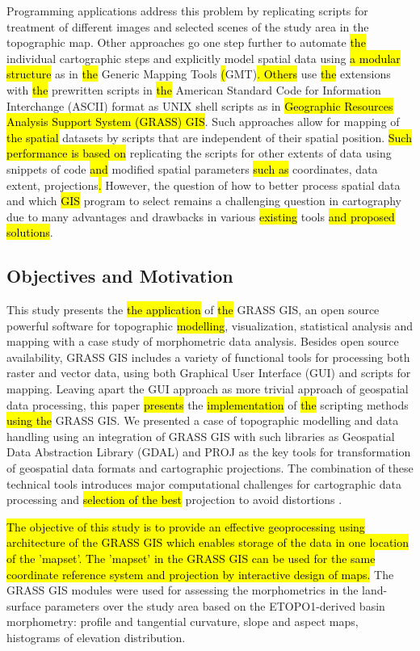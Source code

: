 \documentclass[technologies,article,submit,pdftex,moreauthors]{Definitions/mdpi}
\begin{document}
Programming applications address this problem by replicating scripts for treatment of different images and selected scenes of the study area in the topographic map. Other approaches go one step further to automate \hl{the }individual cartographic steps and explicitly model spatial data using \hl{a modular structure }as in \hl{the }Generic Mapping Tools \hl{(}GMT)\hl{. Others} use \hl{the }extensions with \hl{the }prewritten scripts in \hl{the }American Standard Code for Information Interchange (ASCII) format as UNIX shell scripts as in \hl{Geographic Resources Analysis Support System (GRASS) GIS}. Such approaches allow for mapping of \hl{the spatial }datasets by scripts that are independent of their spatial position. \hl{Such performance is based on} replicating the\hl{ }scripts for other extents of data using snippets of code \hl{and} modified spatial parameters \hl{such as }coordinates, data extent, projections\hl{. }However, the question of how to better process spatial data and which \hl{GIS }program to select remains a challenging question in cartography due to many advantages and drawbacks in various \hl{existing }tools \hl{and proposed solutions}. 

\subsection{Objectives and Motivation}
This study presents the \hl{the application} of \hl{the }GRASS\hl{ }GIS, an open source powerful software for topographic \hl{modelling}, visualization, statistical\hl{ }analysis and mapping with a case study of\hl{ }morphometric data analysis. Besides open source availability, GRASS GIS includes a variety of functional tools for processing both raster and vector data, using both Graphical User Interface (GUI) and scripts for mapping. Leaving apart the GUI approach as more trivial\hl{ }approach of geospatial data processing, this paper \hl{presents} the \hl{implementation} of \hl{the }scripting methods \hl{using the }GRASS GIS. We presented a case of topographic modelling and data handling using an integration of GRASS GIS with such libraries as Geospatial Data Abstraction Library (GDAL) and PROJ as the key tools for transformation of geospatial data formats and cartographic projections. The combination of these technical tools introduces major computational challenges for cartographic data processing and \hl{selection of the best} projection to avoid distortions \cite{Kiani}.

\hl{The objective of this study is to provide an effective geoprocessing using architecture of the GRASS GIS which enables storage of the data in one location of the 'mapset'. The 'mapset' in the GRASS GIS can be used for the same coordinate reference system and projection by interactive design of maps. }The GRASS GIS modules were used for assessing the morphometrics in the land-surface parameters over the study area based on the ETOPO1-derived basin morphometry: profile and tangential curvature, slope and aspect maps, histograms of elevation distribution. 
\end{document}
